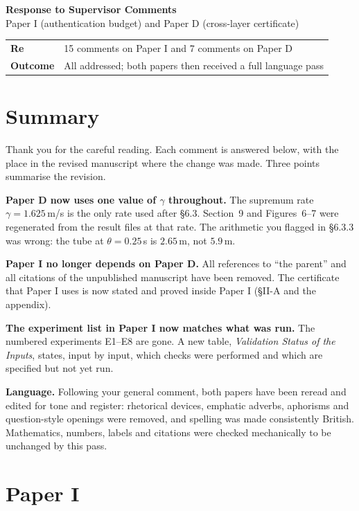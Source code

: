 \documentclass[11pt,a4paper]{article}
\begin{document}
\begin{center}
{\Large\bfseries Response to Supervisor Comments}\\[0.35em]
{\large Paper I (authentication budget) and Paper D (cross-layer certificate)}\\[0.9em]
\begin{tabular}{@{}ll@{}}
\textbf{Re} & 15 comments on Paper I and 7 comments on Paper D\\
\textbf{Outcome} & All addressed; both papers then received a full language pass\\
\end{tabular}
\end{center}

\section*{Summary}

Thank you for the careful reading. Each comment is answered below, with the place
in the revised manuscript where the change was made. Three points summarise the
revision.

\textbf{Paper D now uses one value of $\gamma$ throughout.} The supremum rate
$\gamma=1.625$\,m/s is the only rate used after \S6.3. Section~9 and Figures~6--7
were regenerated from the result files at that rate. The arithmetic you flagged in
\S6.3.3 was wrong: the tube at $\theta=0.25$\,s is $2.65$\,m, not $5.9$\,m.

\textbf{Paper I no longer depends on Paper D.} All references to ``the parent'' and
all citations of the unpublished manuscript have been removed. The certificate that
Paper I uses is now stated and proved inside Paper I (\S II-A and the appendix).

\textbf{The experiment list in Paper I now matches what was run.} The numbered
experiments E1--E8 are gone. A new table, \emph{Validation Status of the Inputs}, states, input by input, which checks were performed and which are
specified but not yet run.

\textbf{Language.} Following your general comment, both papers have been reread
and edited for tone and register: rhetorical devices, emphatic adverbs, aphorisms
and question-style openings were removed, and spelling was made consistently
British. Mathematics, numbers, labels and citations were checked mechanically to be
unchanged by this pass.

\section{Paper I}
\end{document}
